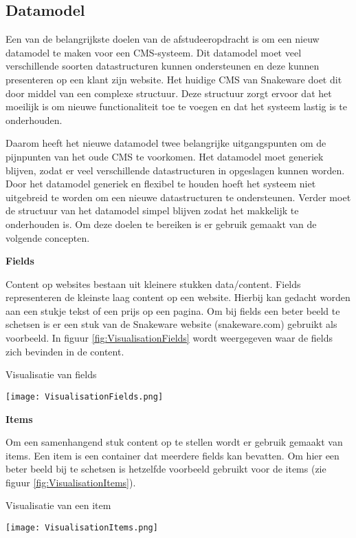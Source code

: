 \subsection{Datamodel}
\label{subsection:Datamodel}
Een van de belangrijkste doelen van de afstudeeropdracht is om een nieuw datamodel te maken voor een CMS-systeem.
Dit datamodel moet veel verschillende soorten datastructuren kunnen ondersteunen en deze kunnen presenteren op een klant zijn website.
Het huidige CMS van Snakeware doet dit door middel van een complexe structuur.
Deze structuur zorgt ervoor dat het moeilijk is om nieuwe functionaliteit toe te voegen en dat het systeem lastig is te onderhouden.

\whitespace
Daarom heeft het nieuwe datamodel twee belangrijke uitgangspunten om de pijnpunten van het oude CMS te voorkomen.
Het datamodel moet generiek blijven, zodat er veel verschillende datastructuren in opgeslagen kunnen worden.
Door het datamodel generiek en flexibel te houden hoeft het systeem niet uitgebreid te worden om een nieuwe datastructuren te ondersteunen.
Verder moet de structuur van het datamodel simpel blijven zodat het makkelijk te onderhouden is.
Om deze doelen te bereiken is er gebruik gemaakt van de volgende concepten.

\whitespace
\textbf{Fields}

\whitespace
Content op websites bestaan uit kleinere stukken data\slash content.
Fields representeren de kleinste laag content op een website. 
Hierbij kan gedacht worden aan een stukje tekst of een prijs op een pagina.
Om bij fields een beter beeld te schetsen is er een stuk van de Snakeware website (snakeware.com) gebruikt als voorbeeld.
In figuur \ref{fig:VisualisationFields} wordt weergegeven waar de fields zich bevinden in de content.

\whitespace[2]
\begin{graphic}
    \captionsetup{type=figure}
    \caption{Visualisatie van fields}
    \texttt{[image: VisualisationFields.png]}
    \label{fig:VisualisationFields}
\end{graphic}

\whitespace
\textbf{Items}

\whitespace
Om een samenhangend stuk content op te stellen wordt er gebruik gemaakt van items.
Een item is een container dat meerdere fields kan bevatten.
Om hier een beter beeld bij te schetsen is hetzelfde voorbeeld gebruikt voor de items (zie figuur \ref{fig:VisualisationItems}).

\whitespace[2]
\begin{graphic}
    \captionsetup{type=figure}
    \caption{Visualisatie van een item}
    \texttt{[image: VisualisationItems.png]}
    \label{fig:VisualisationItems}
\end{graphic}

